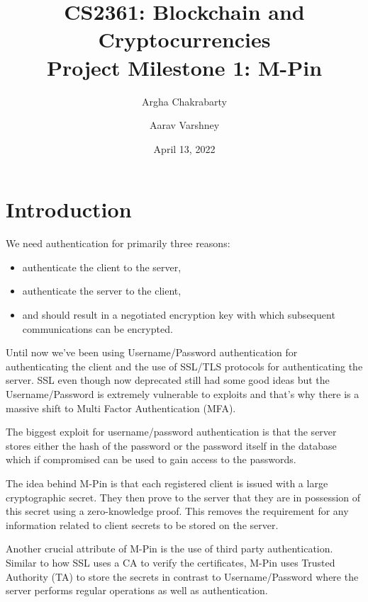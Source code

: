 \documentclass[]{article}   %
\begin{document}
\title{CS2361: Blockchain and Cryptocurrencies\\ Project Milestone 1: M-Pin}   %
\author{Argha Chakrabarty \and Aarav Varshney}         %
\date{April 13, 2022}    %
\maketitle

\section*{Introduction}
We need authentication for primarily three reasons:
\begin{itemize}
    \itemsep0em 
    \item authenticate the client to the server,
    \item authenticate the server to the client, 
    \item and should result in a negotiated encryption key with which subsequent communications can be encrypted.
\end{itemize}
Until now we've been using Username/Password authentication for authenticating the client and the use of SSL/TLS protocols for authenticating the server. SSL even though now deprecated still had some good ideas but the Username/Password is extremely vulnerable to exploits and that's why there is a massive shift to Multi Factor Authentication (MFA). 

The biggest exploit for username/password authentication is that the server stores either the hash of the password or the password itself in the database which if compromised can be used to gain access to the passwords. 

The idea behind M-Pin is that each registered client is issued with a large cryptographic secret. They then prove to the server that they are in possession of this secret using a zero-knowledge proof. This removes the requirement for any information related to client secrets to be stored on the server. 

Another crucial attribute of M-Pin is the use of third party authentication. Similar to how SSL uses a CA to verify the certificates, M-Pin uses Trusted Authority (TA) to store the secrets in contrast to Username/Password where the server performs regular operations as well as authentication. 

\newpage
\end{document}
